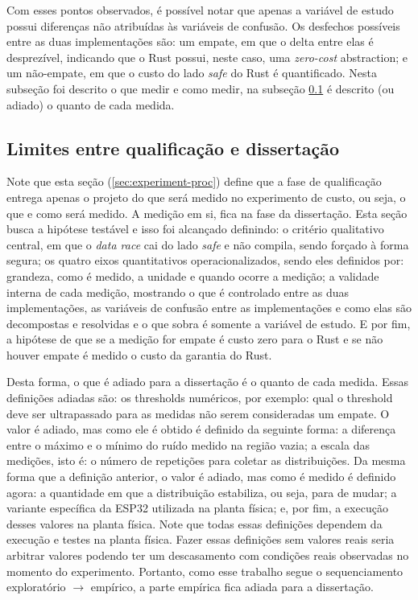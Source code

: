 Com esses pontos observados, é possível notar que apenas a variável de estudo possui diferenças não atribuídas às variáveis de confusão. Os desfechos possíveis entre as duas implementações são: um empate, em que o delta entre elas é desprezível, indicando que o Rust possui, neste caso, uma \textit{zero-cost} abstraction; e um não-empate, em que o custo do lado \textit{safe} do Rust é quantificado. Nesta subseção foi descrito o que medir e como medir, na subseção \ref{subsec:quantity-measurement} é descrito (ou adiado) o quanto de cada medida.

\subsection{Limites entre qualificação e dissertação}
\label{subsec:quantity-measurement}

Note que esta seção (\ref{sec:experiment-proc}) define que a fase de qualificação entrega apenas o projeto do que será medido no experimento de custo, ou seja, o que e como será medido. A medição em si, fica na fase da dissertação. Esta seção busca a hipótese testável e isso foi alcançado definindo: o critério qualitativo central, em que o \textit{data race} cai do lado \textit{safe} e não compila, sendo forçado à forma segura; os quatro eixos quantitativos operacionalizados, sendo eles definidos por: grandeza, como é medido, a unidade e quando ocorre a medição; a validade interna de cada medição, mostrando o que é controlado entre as duas implementações, as variáveis de confusão entre as implementações e como elas são decompostas e resolvidas e o que sobra é somente a variável de estudo. E por fim, a hipótese de que se a medição for empate é custo zero para o Rust e se não houver empate é medido o custo da garantia do Rust.

Desta forma, o que é adiado para a dissertação é o quanto de cada medida. Essas definições adiadas são: os thresholds numéricos, por exemplo: qual o threshold deve ser ultrapassado para as medidas não serem consideradas um empate. O valor é adiado, mas como ele é obtido é definido da seguinte forma: a diferença entre o máximo e o mínimo do ruído medido na região vazia; a escala das medições, isto é: o número de repetições para coletar as distribuições. Da mesma forma que a definição anterior, o valor é adiado, mas como é medido é definido agora: a quantidade em que a distribuição estabiliza, ou seja, para de mudar; a variante específica da ESP32 utilizada na planta física; e, por fim, a execução desses valores na planta física. Note que todas essas definições dependem da execução e testes na planta física. Fazer essas definições sem valores reais seria arbitrar valores podendo ter um descasamento com condições reais observadas no momento do experimento. Portanto, como esse trabalho segue o sequenciamento exploratório $\rightarrow$ empírico, a parte empírica fica adiada para a dissertação.

